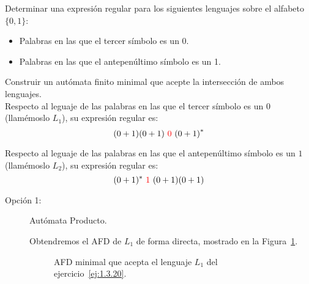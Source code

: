 \begin{ejercicio}\label{ej:1.3.20}
    Determinar una expresión regular para los siguientes lenguajes sobre el alfabeto $\{0,1\}$:
    \begin{itemize}
        \item Palabras en las que el tercer símbolo es un 0.
        \item Palabras en las que el antepenúltimo símbolo es un 1.
    \end{itemize}
    Construir un autómata finito minimal que acepte la intersección de ambos lenguajes.\\

    Respecto al leguaje de las palabras en las que el tercer símbolo es un $0$ (llamémoslo $L_1$), su expresión regular es:
    \begin{equation*}
        (0+1)(0+1) \ \red{0}\  {(0+1)}^{\ast}
    \end{equation*}
    

    Respecto al leguaje de las palabras en las que el antepenúltimo símbolo es un $1$ (llamémoslo $L_2$), su expresión regular es:
    \begin{equation*}
        (0+1)^*\ \red{1}\ (0+1)(0+1)
    \end{equation*}

    \begin{description}
        \item[Opción 1:]  Autómata Producto.
        
        Obtendremos el AFD de $L_1$ de forma directa, mostrado en la Figura~\ref{fig:ej:1.3.20-1:AFD}.
        \begin{figure}
            \centering
            \caption{AFD minimal que acepta el lenguaje $L_1$ del ejercicio~\ref{ej:1.3.20}.}
            \label{fig:ej:1.3.20-1:AFD}
        \end{figure}


\end{description}
\end{ejercicio}
